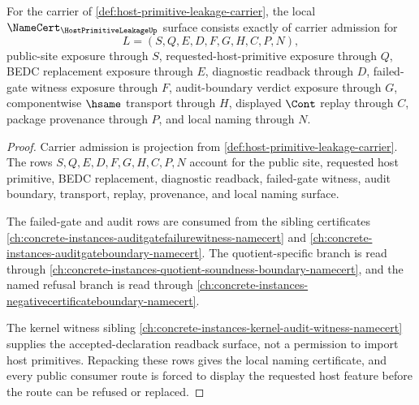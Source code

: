 \begin{theorem}
\label{thm:host-primitive-leakage-namecert-obligations}
For the carrier of \autoref{def:host-primitive-leakage-carrier}, the local $\NameCert_{\HostPrimitiveLeakageUp}$ surface consists exactly of carrier admission for
$$
L=(S,Q,E,D,F,G,H,C,P,N),
$$
public-site exposure through $S$, requested-host-primitive exposure through $Q$, BEDC replacement exposure through $E$, diagnostic readback through $D$, failed-gate witness exposure through $F$, audit-boundary verdict exposure through $G$, componentwise $\hsame$ transport through $H$, displayed $\Cont$ replay through $C$, package provenance through $P$, and local naming through $N$.
\end{theorem}
\begin{proof}
Carrier admission is projection from \autoref{def:host-primitive-leakage-carrier}. The rows $S,Q,E,D,F,G,H,C,P,N$ account for the public site, requested host primitive, BEDC replacement, diagnostic readback, failed-gate witness, audit boundary, transport, replay, provenance, and local naming surface.

The failed-gate and audit rows are consumed from the sibling certificates \autoref{ch:concrete-instances-auditgatefailurewitness-namecert} and \autoref{ch:concrete-instances-auditgateboundary-namecert}. The quotient-specific branch is read through \autoref{ch:concrete-instances-quotient-soundness-boundary-namecert}, and the named refusal branch is read through \autoref{ch:concrete-instances-negativecertificateboundary-namecert}.

The kernel witness sibling \autoref{ch:concrete-instances-kernel-audit-witness-namecert} supplies the accepted-declaration readback surface, not a permission to import host primitives. Repacking these rows gives the local naming certificate, and every public consumer route is forced to display the requested host feature before the route can be refused or replaced.
\end{proof}

